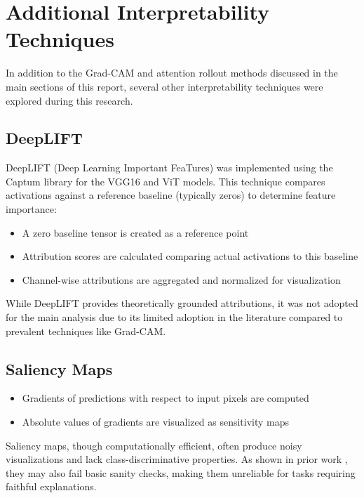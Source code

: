 \documentclass[a4paper,12pt]{report}
\begin{document}
\section{Additional Interpretability Techniques}
\label{appendix:add_interpret}

In addition to the Grad-CAM and attention rollout methods discussed in the main sections of this report, several other interpretability techniques were explored during this research.

\subsection{DeepLIFT}

DeepLIFT (Deep Learning Important FeaTures) was implemented using the Captum library for the VGG16 and ViT models. This technique compares activations against a reference baseline (typically zeros) to determine feature importance:

\begin{itemize}
\item A zero baseline tensor is created as a reference point
\item Attribution scores are calculated comparing actual activations to this baseline
\item Channel-wise attributions are aggregated and normalized for visualization
\end{itemize}

While DeepLIFT provides theoretically grounded attributions, it was not adopted for the main analysis due to its limited adoption in the literature compared to prevalent techniques like Grad-CAM.

\subsection{Saliency Maps}

\begin{itemize}
\item Gradients of predictions with respect to input pixels are computed
\item Absolute values of gradients are visualized as sensitivity maps
\end{itemize}

Saliency maps, though computationally efficient, often produce noisy visualizations and lack class-discriminative properties. As shown in prior work \citep{Adebayo2018}, they may also fail basic sanity checks, making them unreliable for tasks requiring faithful explanations.
\end{document}
